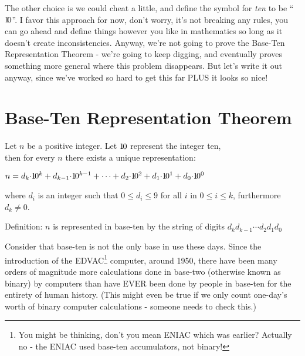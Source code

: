 \documentclass{article}
\newenvironment{jprIn}{\begin{adjustwidth}{2em}{}}{\end{adjustwidth}}
\begin{document}
The other choice is we could cheat a little, and define the symbol for \emph{ten} to be ``$1\hspace{-0.2em}0$''.
I favor this approach for now, don't worry, it's not breaking any rules, you can go ahead and define things
however you like in mathematics so long as it doesn't create inconsistencies.  Anyway, we're not going
to prove the Base-Ten Representation Theorem - we're going to keep digging, and eventually proves something
more general where this problem disappears.  But let's write it out anyway, since we've worked so hard to get this far PLUS
it looks so nice!

\section*{Base-Ten Representation Theorem}

\begin{jprIn}
Let $n$ be a positive integer. Let ${1\hspace{-0.12em}0}$ represent the integer ten,\\
then for every $n$ there exists a unique representation:

\hspace{3em}$n=d_k{\cdot}{1\hspace{-0.12em}0}^k+d_{k-1}{\cdot}{1\hspace{-0.12em}0}^{k-1}+\dots+d_2{\cdot}{1\hspace{-0.12em}0}^2+d_1{\cdot}{1\hspace{-0.12em}0}^1+d_0{\cdot}{1\hspace{-0.12em}0}^0$

where $d_i$ is an integer such that $0\le{}d_i\le{}9$ for all $i$ in $0\le{}i\le{}k$, furthermore $d_k\ne0$.

Definition: $n$ is represented in base-ten by the string of digits $d_kd_{k-1}{\cdots}d_2d_1d_0$
\end{jprIn}
\bigskip

Consider that base-ten is not the only base in use these days.
Since the introduction of the EDVAC\footnote{You might be thinking, don't you
mean ENIAC which was earlier? Actually no - the ENIAC
used base-ten accumulators, not binary!} computer, around 1950,
there have been many orders of magnitude more calculations done
in base-two (otherwise known as binary) by computers than have EVER
been done by people in base-ten for the entirety of human history.
(This might even be true if we only count one-day's worth of
binary computer calculations - someone needs to check this.)
\end{document}
